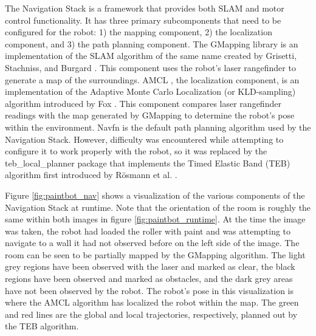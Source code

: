 The Navigation Stack is a framework that provides both SLAM and motor control functionality. It has three primary subcomponents that need to be configured for the robot: 1) the mapping component, 2) the localization component, and 3) the path planning component. The GMapping library \cite{gmapping} is an implementation of the SLAM algorithm of the same name created by Grisetti, Stachniss, and Burgard \cite{grisetti_gmapping}. This component uses the robot's laser rangefinder to generate a map of the surroundings. AMCL \cite{amcl}, the localization component, is an implementation of the Adaptive Monte Carlo Localization (or KLD-sampling) algorithm introduced by Fox \cite{fox2002kld}. This component compares laser rangefinder readings with the map generated by GMapping to determine the robot's pose within the environment. Navfn \cite{navfn} is the default path planning algorithm used by the Navigation Stack. However, difficulty was encountered while attempting to configure it to work properly with the robot, so it was replaced by the teb\_local\_planner package \cite{teb} that implements the Timed Elastic Band (TEB) algorithm first introduced by R{\"o}smann et al. \cite{rosmann2012trajectory}.

Figure \ref{fig:paintbot_nav} shows a visualization of the various components of the Navigation Stack at runtime. Note that the orientation of the room is roughly the same within both images in figure \ref{fig:paintbot_runtime}. At the time the image was taken, the robot had loaded the roller with paint and was attempting to navigate to a wall it had not observed before on the left side of the image. The room can be seen to be partially mapped by the GMapping algorithm. The light grey regions have been observed with the laser and marked as clear, the black regions have been observed and marked as obstacles, and the dark grey areas have not been observed by the robot. The robot's pose in this visualization is where the AMCL algorithm has localized the robot within the map. The green and red lines are the global and local trajectories, respectively, planned out by the TEB algorithm.